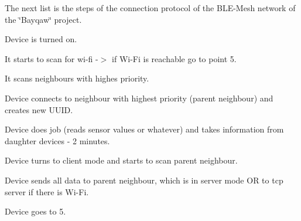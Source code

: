 The next list is the steps of the connection protocol of the B\+L\+E-\/\+Mesh network of the \char`\"{}\+Bayqaw\char`\"{} project.
\begin{DoxyEnumerate}
\item Device is turned on.
\item It starts to scan for wi-\/fi -\/$>$ if Wi-\/\+Fi is reachable go to point 5.
\item It scans neighbours with highes priority.
\item Device connects to neighbour with highest priority (parent neighbour) and creates new U\+U\+ID.
\item Device does job (reads sensor values or whatever) and takes information from daughter devices -\/ 2 minutes.
\item Device turns to client mode and starts to scan parent neighbour.
\item Device sends all data to parent neighbour, which is in server mode OR to tcp server if there is Wi-\/\+Fi.
\item Device goes to 5. 
\end{DoxyEnumerate}